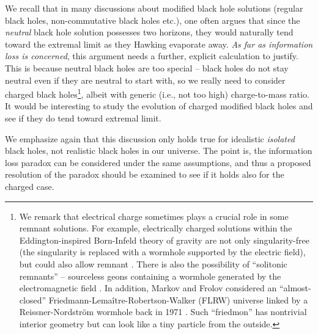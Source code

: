\documentclass[12pt]{article}
\newcommand{\2}{$^2$}
\newcommand{\3}{$^3$}
\newcommand{\4}{$_4$}
\newcommand{\5}{$_5$}
\begin{document}
We recall that in many discussions about modified black hole solutions (regular black holes, non-commutative black holes etc.), one often argues that since the \emph{neutral} black hole solution possesses two horizons, they would naturally tend toward the extremal limit as they Hawking evaporate away. 
\emph{As far as information loss is concerned}, this argument needs a further, explicit calculation to justify. This is because neutral black holes are too special -- black holes do not stay neutral even if they are neutral to start with, so we really need to consider charged black holes\footnote{We remark that
electrical charge sometimes plays a crucial role in some remnant solutions. For example, 
electrically charged solutions within the Eddington-inspired Born-Infeld theory of gravity are not only singularity-free (the singularity is replaced with a wormhole supported by the electric field), but could also allow remnant \cite{1311.0815}. There is also the possibility of ``solitonic remnants'' -- sourceless geons containing a wormhole generated by the electromagnetic field \cite{1306.2504}. In addition, Markov and Frolov considered an ``almost-closed'' Friedmann-Lema\^itre-Robertson-Walker (FLRW) universe linked by a Reissner-Nordstr\"om wormhole back in 1971 \cite{MM0}. Such ``friedmon'' has nontrivial interior geometry but can look like a tiny particle from the outside.}, albeit with generic (i.e., not too high) charge-to-mass ratio. It would be interesting to study the evolution of charged modified black holes and see if they do tend toward extremal limit.  

We emphasize again that this discussion only holds true for idealistic \emph{isolated} black holes, not realistic black holes in our universe. The point is, the information loss paradox can be considered under the same assumptions, and thus a proposed resolution of the paradox should be examined to see if it holds also for the charged case. 
\end{document}
